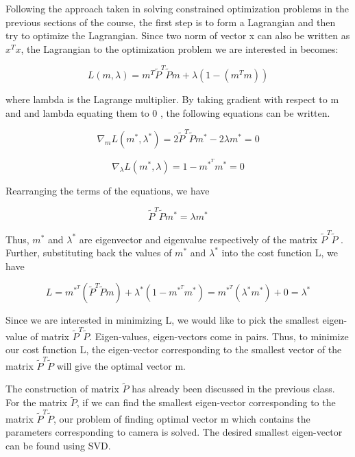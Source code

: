 \documentclass[twoside]{article}
\begin{document}
Following the approach taken in solving constrained optimization problems in the previous sections of the course, the first step is to form a Lagrangian and then try to optimize the Lagrangian. Since two norm of vector x can also be written as $x^T x$, the Lagrangian to the optimization problem we are interested in becomes:

\begin{equation} \label{eqno:4}
 L(m,\lambda) = m^T \tilde{P}^T \tilde{P}m + \lambda (1-(m^T m))
\end{equation}

where lambda is the Lagrange multiplier. By taking gradient with respect to m and and lambda equating them to 0 , the following equations can be written.


\begin{equation} \label{eqno:5}
\nabla_m{L(m^*,\lambda^*)} = 2 \tilde{P}^T \tilde{P} m^* - 2 \lambda m^* = 0
\end{equation}

\begin{equation} \label{eqno:6}
\nabla_\lambda{L(m^*,\lambda)} = 1-  m^*^T m^* = 0
\end{equation}


Rearranging the terms of the equations, we have 

\begin{equation} \label{eqno:7}
\tilde{P}^T \tilde{P} m^* =  \lambda m^*  \end{equation}

Thus, $m^*$ and $\lambda^* $ are eigenvector and eigenvalue respectively of the matrix $ \tilde{P}^T \tilde{P}$ . Further, substituting back the values of  $m^*$ and $\lambda^* $ into the cost function L, we have 

\begin{equation} \label{eqno:8}
L = m^*^T(\tilde{P}^T \tilde{P} m)+ \lambda^* (1-m^*^T m^*) = m^*^T(\lambda^* m^*) + 0 = \lambda^*
\end{equation}

Since we are interested in minimizing L, we would like to pick the smallest eigen-value of matrix $\tilde{P}^T \tilde{P}$. Eigen-values, eigen-vectors come in pairs. Thus, to minimize our cost function L, the eigen-vector corresponding to the smallest vector of the matrix $\tilde{P}^T \tilde{P}$ will give the optimal vector m. 

The construction of matrix $\tilde{P}$ has already been discussed in the previous class. For the matrix $\tilde{P}$, if we can find the smallest eigen-vector corresponding to the matrix $\tilde{P}^T \tilde{P}$, our problem of finding optimal vector m which contains the parameters corresponding to camera is solved. The desired smallest eigen-vector can be found using SVD.
\end{document}
